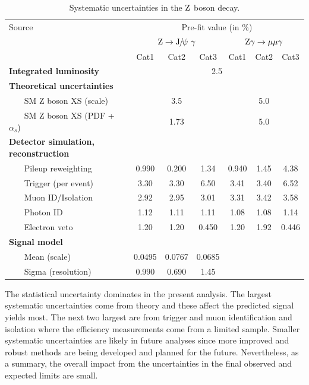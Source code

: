 	\begin{table}[!ht]
	\scriptsize
	  \begin{center}
	    
	    \begin{tabular}{lcccccc}
	      \hline
	      Source & \multicolumn{6}{c}{Pre-fit value (in \%)} \\
	      \cline{2-7}
	      & \multicolumn{3}{c}{$\mathrm{Z}\rightarrow{\mathrm{J}\hspace{-.08em}/\hspace{-.14em}\psi}\ \gamma$} & \multicolumn{3}{c}{$\mathrm{Z}\gamma\to\mu\mu\gamma$}\\
	      & Cat1 & Cat2 & Cat3 & Cat1 & Cat2 & Cat3\\
	      \hline
	      \textbf{Integrated luminosity} & \multicolumn{6}{c}{2.5}\\
	      \textbf{Theoretical uncertainties} & \multicolumn{6}{c}{ } \\
	      ~~~ SM Z boson XS (scale) & \multicolumn{3}{c}{3.5} & \multicolumn{3}{c}{5.0}\\
	      ~~~ SM Z boson XS (PDF + $\alpha_{s}$) & \multicolumn{3}{c}{1.73} & \multicolumn{3}{c}{5.0}\\
	      \textbf{Detector simulation, reconstruction} & \multicolumn{6}{c}{ } \\
	      ~~~ Pileup reweighting          & 0.990 & 0.200 & 1.34 & 0.940 & 1.45 & 4.38 \\
	      ~~~ Trigger (per event)& 3.30 & 3.30 & 6.50 & 3.41 & 3.40 & 6.52 \\
	      ~~~ Muon ID/Isolation & 2.92 & 2.95 & 3.01 & 3.31 & 3.42 & 3.58 \\
	      ~~~ Photon ID & 1.12 & 1.11 & 1.11 & 1.08 & 1.08 & 1.14 \\
	      ~~~ Electron veto & 1.20 & 1.20 & 0.450 & 1.20 & 1.92 & 0.446 \\
	      \textbf{Signal model} & \multicolumn{6}{c}{ } \\
	      ~~~ Mean (scale) & 0.0495 & 0.0767 & 0.0685 &  \multicolumn{3}{c}{\mdash}\\
	      ~~~ Sigma (resolution)  & 0.990 & 0.690 & 1.45 & \multicolumn{3}{c}{\mdash}\\
	      \hline
	    \end{tabular}
	    \caption{Systematic uncertainties in the $\mathrm{Z}$ boson decay.\label{tab:systZ}}
	  \end{center}
	\end{table}
	
	The statistical uncertainty dominates in the present analysis. The largest systematic uncertainties come from theory and these affect the predicted signal yields most. The next two largest are from trigger and muon identification and isolation where the efficiency measurements come from a limited sample. Smaller systematic uncertainties are likely in future analyses since more improved and robust methods are being developed and planned for the future. Nevertheless, as a summary, the overall impact from the uncertainties in the final observed and expected limits are small.
	
